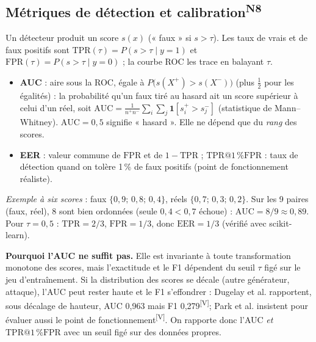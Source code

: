 \documentclass[10pt,a4paper]{article}
\makeatletter
\newcommand{\sV}{\textsuperscript{\scriptsize\textcolor{green!40!black}{[V]}}}
\newcommand{\tprfpr}{\mathrm{TPR}@1\,\%\mathrm{FPR}}
\newcommand{\AUC}{\mathrm{AUC}}
\newcommand{\EER}{\mathrm{EER}}
\newcommand{\TPR}{\mathrm{TPR}}
\newcommand{\FPR}{\mathrm{FPR}}
\newcommand{\nref}[1]{\textsuperscript{\scriptsize\textcolor{black!55}{#1}}}
\makeatother
\begin{document}
\subsection{Métriques de détection et calibration\nref{N8}}
Un détecteur produit un score $s(x)$ (« faux » si $s>\tau$). Les taux de vrais et de faux positifs sont $\TPR(\tau)=P(s>\tau\mid y{=}1)$ et $\FPR(\tau)=P(s>\tau\mid y{=}0)$ ; la courbe ROC les trace en balayant $\tau$.
\begin{itemize}
  \item \textbf{AUC} : aire sous la ROC, égale à $P\big(s(X^+)>s(X^-)\big)$ (plus $\tfrac12$ pour les égalités) : la probabilité qu'un faux tiré au hasard ait un score supérieur à celui d'un réel, soit $\AUC=\frac1{n^+n^-}\sum_{i}\sum_{j}\mathbf 1[s_i^+>s_j^-]$ (statistique de Mann--Whitney). $\AUC=0{,}5$ signifie « hasard ». Elle ne dépend que du \emph{rang} des scores.
  \item \textbf{EER} : valeur commune de $\FPR$ et de $1-\TPR$ ; \textbf{$\tprfpr$} : taux de détection quand on tolère 1\,\% de faux positifs (point de fonctionnement réaliste).
\end{itemize}
\emph{Exemple à six scores} : faux $\{0{,}9;\,0{,}8;\,0{,}4\}$, réels $\{0{,}7;\,0{,}3;\,0{,}2\}$. Sur les 9 paires (faux, réel), 8 sont bien ordonnées (seule $0{,}4<0{,}7$ échoue) : $\AUC=8/9\ensuremath{\approx}0{,}89$. Pour $\tau=0{,}5$ : $\TPR=2/3$, $\FPR=1/3$, donc $\EER=1/3$ (vérifié avec scikit-learn).

\textbf{Pourquoi l'AUC ne suffit pas.} Elle est invariante à toute transformation monotone des scores, mais l'exactitude et le F1 dépendent du seuil $\tau$ figé sur le jeu d'entraînement. Si la distribution des scores se décale (autre générateur, attaque), l'AUC peut rester haute et le F1 s'effondrer : Dugelay et al. rapportent, sous décalage de hauteur, AUC 0,963 mais F1 0,279\sV ; Park et al. insistent pour évaluer aussi le point de fonctionnement\sV. On rapporte donc l'AUC \emph{et} $\tprfpr$ avec un seuil figé sur des données propres.
\end{document}
